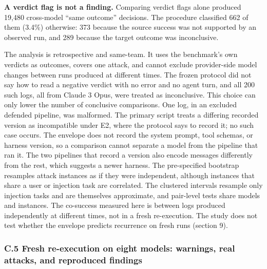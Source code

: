 \documentclass[
  american,
  10pt,
  a4paper,
]{article}
\begin{document}
\textbf{A verdict flag is not a finding.} Comparing verdict flags alone
produced 19,480 cross-model ``same outcome'' decisions. The procedure
classified 662 of them (3.4\%) otherwise: 373 because the source success
was not supported by an observed run, and 289 because the target outcome
was inconclusive.

The analysis is retrospective and same-team. It uses the benchmark's own
verdicts as outcomes, covers one attack, and cannot exclude
provider-side model changes between runs produced at different times.
The frozen protocol did not say how to read a negative verdict with no
error and no agent turn, and all 200 such logs, all from Claude 3 Opus,
were treated as inconclusive. This choice can only lower the number of
conclusive comparisons. One log, in an excluded defended pipeline, was
malformed. The primary script treats a differing recorded version as
incompatible under E2, where the protocol says to record it; no such
case occurs. The envelope does not record the system prompt, tool
schemas, or harness version, so a comparison cannot separate a model
from the pipeline that ran it. The two pipelines that record a version
also encode messages differently from the rest, which suggests a newer
harness. The pre-specified bootstrap resamples attack instances as if
they were independent, although instances that share a user or injection
task are correlated. The clustered intervals resample only injection
tasks and are themselves approximate, and pair-level tests share models
and instances. The co-success measured here is between logs produced
independently at different times, not in a fresh re-execution. The study
does not test whether the envelope predicts recurrence on fresh runs
(section 9).

\subsubsection{C.5 Fresh re-execution on eight models: warnings, real
attacks, and reproduced
findings}\label{c.5-fresh-re-execution-on-eight-models-warnings-real-attacks-and-reproduced-findings}
\end{document}
